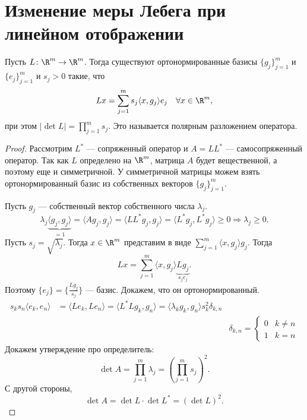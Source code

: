 \section{Изменение меры Лебега при линейном отображении}
\begin{lm}
	Пусть  $ L\colon \R^{m} \to \R^{m} $. Тогда существуют ортонормированные базисы $ \{g_j\}_{j=1}^{m}$ и $ \{e_j\}_{j=1}^{m}$ и $ s_j > 0$ такие, что
	 \[
	Lx = \sum_{j=1}^{m} s_j \langle x, g_j \rangle e_j \quad \forall x \in \R^{m} 
	,\] 
	при этом  $ \lvert \det L \rvert = \prod_{j=1}^{m} s_j$.
	Это называется \textsf{полярным разложением оператора}.
\end{lm}
\begin{proof}
	Рассмотрим $ L^{*}$ --- сопряженный оператор и $ A = L L^{*}$ --- самосопряженный оператор. Так как $ L$ определено на $ \R^{m} $, матрица $ A$ будет вещественной, а поэтому еще и симметричной. У симметричной матрицы можем взять ортонормированный базис из собственных векторов $ \{g_j\}_{j=1}^{m}$. 

	Пусть $ g_j$ --- собственный вектор собственного числа $  \lambda _j$.  
	\[
		\lambda _j \underbrace{\langle g_j, g_j \rangle}_{=1} = \langle Ag_j , g_j \rangle = \langle LL^{*}g_j, g_j \rangle = \langle L^{*}g_j, L^{*}g_j \rangle \ge 0 \Longrightarrow \lambda _j \ge 0
	.\] 
	Пусть $ s_j = \sqrt{ \lambda _j} $. Тогда $ x \in \R^{m}  $ представим в виде $ \sum_{j=1}^{m} \langle x, g_j \rangle g_j$. Тогда
	\[
		Lx = \sum_{j=1}^{m} \langle x, g_j \rangle \underbrace{Lg_j}_{s_j e_j}
	.\] 
	Поэтому $ \{e_j\} = \{\frac{Lg_j}{s_j}\}$ --- базис. Докажем, что он ортонормированный.
	\[
	\begin{aligned}
		s_ks_n \langle e_k , e_n \rangle &= \langle Le_k, Le_n \rangle = \langle L^{*} L g_k, g_n \rangle = \langle \lambda _kg_k, g_n \rangle s_{k}^2\delta _{k, n} \\
		&&\delta _{k, n} = 
		\begin{cases}
			0 & k\ne n\\
			1 & k = n
		\end{cases}
	\end{aligned}
	\]
	Докажем утверждение про определитель:
	\[
		\det A = \prod_{j=1}^{m} \lambda_{j} = \left( \prod_{j=1}^{m}s_j \right) ^2
	.\] 
	С другой стороны,
	\[
		\det  A = \det L \cdot \det L^{*}  =(\det L)^2
	.\] 
\end{proof}

